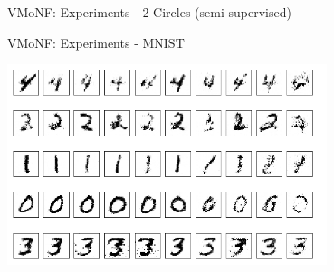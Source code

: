 \documentclass[12pt,ignorenonframetext,]{beamer}
\begin{document}
\begin{frame}{VMoNF: Experiments - 2 Circles (semi supervised)}
\protect\hypertarget{vmonf-experiments---2-circles-semi-supervised}{}

\centering
{}
\hfill
{}

\end{frame}

\begin{frame}{VMoNF: Experiments - MNIST}
\protect\hypertarget{vmonf-experiments---mnist}{}

\centering

\includegraphics[width=0.7\textwidth]{figures/trained_mnist.png}

\end{frame}
\end{document}
